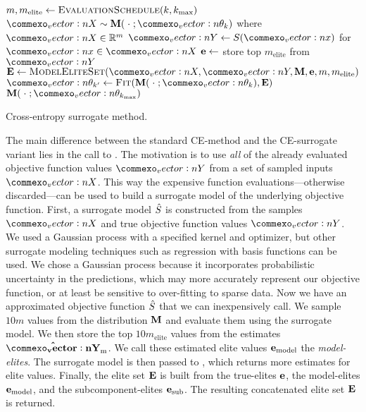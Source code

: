 \begin{algorithm}[ht]
  \begin{algorithmic}
        \State $m, m_\text{elite} \leftarrow \textproc{EvaluationSchedule}(k, k_\text{max})$
        \State $\mat{X} \sim \M(\;\cdot\;; \vec{\theta}_k)$ where $\mat{X} \in \R^m$
        \State $\mat{Y} \leftarrow S(\vec{x})$ for $\vec{x} \in \mat{X}$
        \State $\mathbf{e} \leftarrow$ store top $m_\text{elite}$ from $\mat{Y}$
        \State $\bfE \leftarrow \textproc{ModelEliteSet}(\mat{X}, \mat{Y}, \M, \e, m, m_\text{elite})$
        \State $\vec{\theta}_{k^\prime} \leftarrow \textproc{Fit}(\M(\;\cdot\;; \vec{\theta}_k), \bfE)$
    \EndFor
    \State \Return $\M(\;\cdot\;; \vec{\theta}_{k_\text{max}})$
  \EndFunction
  \end{algorithmic}
  \caption{\label{alg:ce_surrogate} Cross-entropy surrogate method.}
\end{algorithm}


The main difference between the standard CE-method and the CE-surrogate variant lies in the call to .
The motivation is to use \textit{all} of the already evaluated objective function values $\mat{Y}$ from a set of sampled inputs $\mat{X}$.
This way the expensive function evaluations---otherwise discarded---can be used to build a surrogate model of the underlying objective function.
First, a surrogate model $\hat{S}$ is constructed from the samples $\mat{X}$ and true objective function values $\mat{Y}$.
We used a Gaussian process with a specified kernel and optimizer, but other surrogate modeling techniques such as regression with basis functions can be used.
We chose a Gaussian process because it incorporates probabilistic uncertainty in the predictions, which may more accurately represent our objective function, or at least be sensitive to over-fitting to sparse data.
Now we have an approximated objective function $\hat{S}$ that we can inexpensively call. 
We sample $10m$ values from the distribution $\mathbf{M}$ and evaluate them using the surrogate model.
We then store the top $10m_\text{elite}$ values from the estimates $\mathbf{\hat{\mat{Y}}}_\text{m}$.
We call these estimated elite values $\mathbf{e}_\text{model}$ the \textit{model-elites}.
The surrogate model is then passed to , which returns more estimates for elite values.
Finally, the elite set $\mathbf{E}$ is built from the true-elites $\mathbf{e}$, the model-elites $\mathbf{e}_\text{model}$, and the subcomponent-elites $\mathbf{e}_\text{sub}$.
The resulting concatenated elite set $\mathbf{E}$ is returned.

